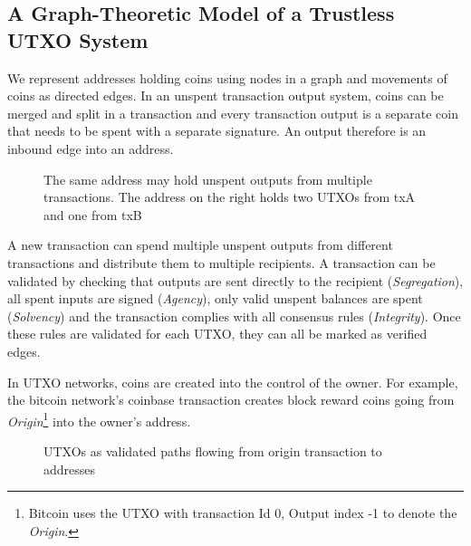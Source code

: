 \documentclass[12pt,a4paper]{article}
\begin{document}
\subsection{A Graph-Theoretic Model of a Trustless UTXO System}
We represent addresses holding coins using nodes in a graph and movements of coins as directed edges. In an unspent transaction output system, coins can be merged and split in a transaction and every transaction output is a separate coin that needs to be spent with a separate signature. An output therefore is an inbound edge into an address.

\begin{figure}[ht]
\begin{center}

\end{center}
\caption{The same address may hold unspent outputs from multiple transactions. The address on the right holds two UTXOs from txA and one from txB}
\end{figure}

A new transaction can spend multiple unspent outputs from different transactions and distribute them to multiple recipients\cite{Max13}. A transaction can be validated by checking that outputs are sent directly to the recipient (\emph{Segregation}), all spent inputs are signed (\emph{Agency}), only valid unspent balances are spent (\emph{Solvency}) and the transaction complies with all consensus rules (\emph{Integrity}). Once these rules are validated for each UTXO, they can all be marked as verified edges. 

In UTXO networks, coins are created into the control of the owner. For example, the bitcoin network’s coinbase transaction creates block reward coins going from \emph{Origin}\footnote{Bitcoin uses the UTXO with transaction Id 0, Output index -1 to denote the \emph{Origin}\cite{BTCProtocol}.} into the owner’s address. 
\begin{figure}[ht]
\begin{center}

\end{center}
\caption{UTXOs as validated paths flowing from origin transaction to addresses }
\end{figure}
\end{document}
